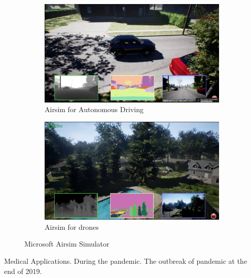 \begin{figure}[H]
\centering
\begin{subfigure}[b]{0.48\textwidth}
    \centering
    \includegraphics[width=\textwidth]{figures/chapter_intro/airsim_car.jpg}
    \caption{Airsim for Autonomous Driving}
    \label{fig:airsim_car}
\end{subfigure}
\hfill
\begin{subfigure}[b]{0.48\textwidth}
    \centering
    \includegraphics[width=\textwidth]{figures/chapter_intro/airsim_drone.jpg}
    \caption{Airsim for drones}
    \label{fig:airsim_drone}
\end{subfigure}
\hfill
\caption{Microsoft Airsim Simulator}
\label{fig.airsim}
\end{figure}

Medical Applications. During the pandemic. The outbreak of pandemic at the end of 2019.



